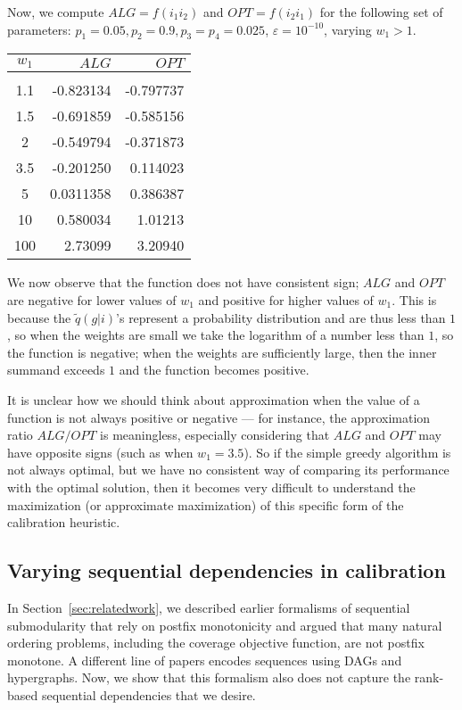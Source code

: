 Now, we compute $ALG = f(i_1i_2)$ and $OPT = f(i_2i_1)$ for the following set of parameters: $p_1 = 0.05, p_2 = 0.9, p_3=p_4 = 0.025$, $\varepsilon = 10^{-10}$, varying $w_1 > 1$. 
\begin{center}
\begin{tabular}{ c r r }
$w_1$ & $ALG$ & $OPT$ \\[3pt] \hline\\[-6pt]
1.1 & -0.823134 & -0.797737 \\[3pt]
1.5 & -0.691859 & -0.585156 \\[3pt]
2 & -0.549794 & -0.371873 \\[3pt]
3.5 & -0.201250 & 0.114023 \\[3pt]
5 & 0.0311358 & 0.386387 \\[3pt]
10 & 0.580034 & 1.01213 \\[3pt]
100 & 2.73099 & 3.20940 
\end{tabular}
\end{center}

We now observe that the function does not have consistent sign; $ALG$ and $OPT$ are negative for lower values of $w_1$ and positive for higher values of $w_1$. This is because the $\tilde{q}(g|i)$'s represent a probability distribution and are thus less than $1$, so when the weights are small we take the logarithm of a number less than $1$, so the function is negative; when the weights are sufficiently large, then the inner summand exceeds $1$ and the function becomes positive.

It is unclear how we should think about approximation when the value of a function is not always positive or negative --- for instance, the approximation ratio $ALG/OPT$ is meaningless, especially considering that $ALG$ and $OPT$ may have opposite signs (such as when $w_1 = 3.5$). So if the simple greedy algorithm is not always optimal, but we have no consistent way of comparing its performance with the optimal solution, then it becomes very difficult to understand the maximization (or approximate maximization) of this specific form of the calibration heuristic.


\subsection{Varying sequential dependencies in calibration}\label{sec:calibration_seqdep}

In Section~\ref{sec:relatedwork}, we described earlier formalisms of sequential submodularity that rely on postfix monotonicity and argued that many natural ordering problems, including the coverage objective function, are not postfix monotone. A different line of papers encodes sequences using DAGs and hypergraphs. Now, we show that this formalism also does not capture the rank-based sequential dependencies that we desire.

